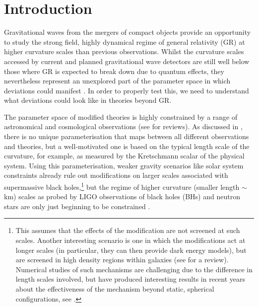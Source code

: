 \documentclass[reprint,aps,amsmath,amssymb,twoside,prd,showkeys,superscriptaddress,nofootinbib]{revtex4-2}
\begin{document}
\section{Introduction}
\label{sec:intro}

Gravitational waves from the mergers of compact objects provide an opportunity to study the strong field, highly dynamical regime of general relativity (GR) at higher curvature scales than previous observations. Whilst the curvature scales accessed by current and planned gravitational wave detectors are still well below those where GR is expected to break down due to quantum effects, they nevertheless represent an unexplored part of the parameter space in which deviations could manifest \cite{LISA:2022kgy,Perkins:2020tra,Barausse:2020rsu, Gnocchi:2019jzp,Barack:2018yly,Baker:2014zba}. 
In order to properly test this, we need to understand what deviations could look like in theories beyond GR.

The parameter space of modified theories is highly constrained by a range of astronomical and cosmological observations (see \cite{Baker:2014zba, Koyama:2015vza, Berti:2015itd, Ferreira:2019xrr} for reviews). As discussed in \cite{Baker:2014zba}, there is no unique parameterisation that maps between all different observations and theories, but a well-motivated one is based on the typical length scale of the curvature, for example, as measured by the Kretschmann scalar of the physical system. Using this parameterisation, weaker gravity scenarios like solar system constraints already rule out modifications on larger scales associated with supermassive black holes,\footnote{This assumes that the effects of the modification are not screened at such scales. Another interesting scenario is one in which the modifications act at longer scales (in particular, they can then provide dark energy models), but are screened in high density regions within galaxies (see \cite{Koyama:2015vza} for a review). Numerical studies of such mechanisms are challenging due to the difference in length scales involved, but have produced interesting results in recent years about the effectiveness of the mechanism beyond static, spherical configurations, see \cite{Shibata:2022gec,Lara:2022gof,Bezares:2021dma,Bezares:2021yek}.} 
but the regime of higher curvature (smaller length $\sim$ km) scales as probed by LIGO observations of black holes (BHs) and neutron stars are only just beginning to be constrained \cite{Evstafyeva:2022rve,Perkins:2021mhb,Toubiana:2020vtf,Carson:2019fxr,Yunes:2016jcc,Berti:2015itd}.
\end{document}
